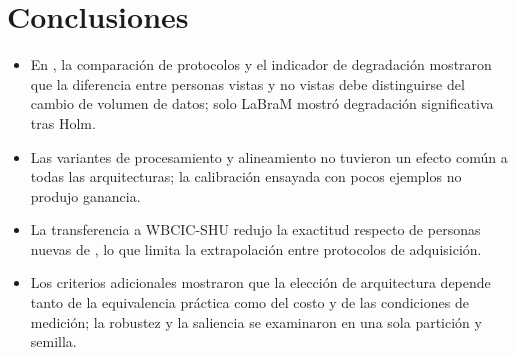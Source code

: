 \section{Conclusiones}

\begin{itemize}
\item En \openbmi{}, la comparación de protocolos y el indicador de degradación mostraron que la diferencia entre personas vistas y no vistas debe distinguirse del cambio de volumen de datos; solo LaBraM mostró degradación significativa tras Holm.
\item Las variantes de procesamiento y alineamiento no tuvieron un efecto común a todas las arquitecturas; la calibración ensayada con pocos ejemplos no produjo ganancia.
\item La transferencia a WBCIC-SHU redujo la exactitud respecto de personas nuevas de \openbmi{}, lo que limita la extrapolación entre protocolos de adquisición.
\item Los criterios adicionales mostraron que la elección de arquitectura depende tanto de la equivalencia práctica como del costo y de las condiciones de medición; la robustez y la saliencia se examinaron en una sola partición y semilla.
\end{itemize}
